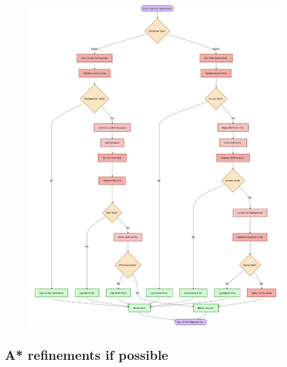 \begin{figure}[htbp]
    \centering
    \includegraphics[width=0.8\linewidth]{Flowcharts/json.png}

\end{figure}

\newpage

\subsection{A* refinements if possible}

